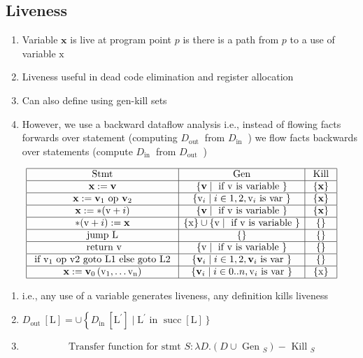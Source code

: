 \documentclass[a4paper]{article}
\theoremstyle{definition}
\begin{document}
\subsection{Liveness}
\begin{enumerate}
    \item  Variable $\mathbf{x}$ is live at program point $p$ is there is a path from $p$ to a use of variable $\mathrm{x}$
\item Liveness useful in dead code elimination and register allocation
\item Can also define using gen-kill sets
\item However, we use a backward dataflow analysis i.e., instead of flowing facts forwards over statement (computing $D_{\text {out }}$ from $D_{\text {in }}$ ) we flow facts backwards over statements (compute $D_{\text {in }}$ from $D_{\text {out }}$ )
\end{enumerate}
$$\begin{array}{|c|c|c|}
\hline \text { Stmt } & \text { Gen } & \text { Kill } \\
\hline \mathbf{x}:=\mathbf{v} & \{\mathbf{v} \mid \text { if } \mathrm{v} \text { is variable }\} & \{\mathbf{x}\} \\
\hline \mathbf{x}:=\mathbf{v}_{1} \text { op } \mathbf{v}_{2} & \left\{\mathrm{v}_{i} \mid i \in 1,2, \mathrm{v}_{i} \text { is var }\right\} & \{\mathbf{x}\} \\
\hline \mathbf{x}:=*(\mathrm{v}+i) & \{\mathbf{v} \mid \text { if } \mathrm{v} \text { is variable }\} & \{\mathbf{x}\} \\
\hline *(\mathrm{v}+i):=\mathbf{x} & \{\mathrm{x}\} \cup\{\mathrm{v} \mid \text { if } \mathrm{v} \text { is variable }\} & \{\} \\
\hline \text { jump L } & \{\} & \{\} \\
\hline \text { return } \mathrm{v} & \{\mathrm{v} \mid \text { if } \mathrm{v} \text { is variable }\} & \{\} \\
\hline \text { if } \mathrm{v}_{1} \text { op v2 goto L1 else goto L2 } & \left\{\mathbf{v}_{i} \mid i \in 1,2, \mathbf{v}_{i} \text { is var }\right\} & \{\} \\
\hline \mathbf{x}:=\mathbf{v}_{0}\left(\mathrm{v}_{1}, \ldots \mathrm{v}_{\mathrm{n}}\right) & \left\{\mathbf{v}_{i} \mid i \in 0 . . n, \mathrm{v}_{i} \text { is var }\right\} & \{\mathrm{x}\} \\
\hline
\end{array}$$
\begin{enumerate}
    \item i.e., any use of a variable generates liveness, any definition kills liveness 
    \item $D_{\text {out }}[\mathrm{L}]=\cup\left\{D_{\text {in }}\left[\mathrm{L}^{\prime}\right] \mid \mathrm{L}^{\prime}\right.$ in $\left.\operatorname{succ}[\mathrm{L}]\right\}$
    \item $$\text { Transfer function for stmt } S: \lambda D .\left(D \cup \text { Gen }_{S}\right)-\text { Kill }_{S}$$
\end{enumerate}
\end{document}
